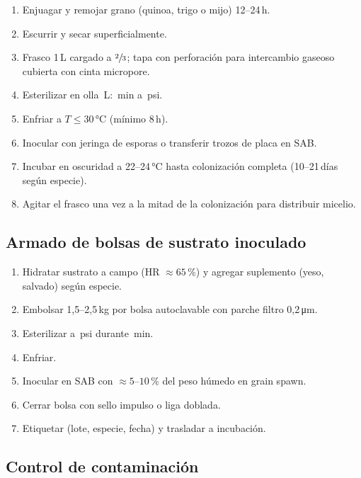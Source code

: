 \begin{enumerate}[leftmargin=*,itemsep=0pt]
  \item Enjuagar y remojar grano (quinoa, trigo o mijo) 12--24\,h.
  \item Escurrir y secar superficialmente.
  \item Frasco 1\,L cargado a $\sfrac{2}{3}$; tapa con perforación
        para intercambio gaseoso cubierta con cinta micropore.
  \item Esterilizar en olla \paramVolOllaPresion\,L: \paramTiempoEsterGrano\,min
        a \paramPresionEster\,psi.
  \item Enfriar a $T \leq 30\,\si{\celsius}$ (mínimo 8\,h).
  \item Inocular con jeringa de esporas o transferir trozos de placa
        en SAB.
  \item Incubar en oscuridad a 22--24\,\si{\celsius} hasta colonización
        completa (10--21\,días según especie).
  \item Agitar el frasco una vez a la mitad de la colonización para
        distribuir micelio.
\end{enumerate}

\subsection{Armado de bolsas de sustrato inoculado}
\label{sec:preparacion:bolsas}

\begin{enumerate}[leftmargin=*,itemsep=0pt]
  \item Hidratar sustrato a campo (HR $\approx 65$\,\%) y agregar
        suplemento (yeso, salvado) según especie.
  \item Embolsar 1{,}5--2{,}5\,kg por bolsa autoclavable con parche
        filtro 0{,}2\,\si{\micro\meter}.
  \item Esterilizar a \paramPresionEster\,psi durante
        \paramTiempoEsterSustrato\,min.
  \item Enfriar.
  \item Inocular en SAB con $\approx 5$--$10$\,\% del peso húmedo en
        grain spawn.
  \item Cerrar bolsa con sello impulso o liga doblada.
  \item Etiquetar (lote, especie, fecha) y trasladar a incubación.
\end{enumerate}

\subsection{Control de contaminación}
\label{sec:preparacion:contam}

